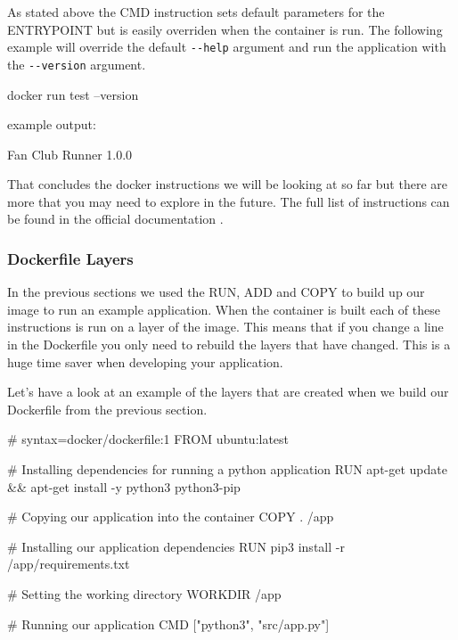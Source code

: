 \documentclass{csse4400}
\begin{document}
As stated above the CMD instruction sets default parameters for the ENTRYPOINT but is easily overriden when the container is run. The following example will override the default \verb|--help| argument and run the application with the \verb|--version| argument.

\begin{code}[language=shell,numbers=none]{}
  docker run test --version
\end{code}

example output:

\begin{code}[language=shell,numbers=none]{}
  Fan Club Runner 1.0.0
\end{code}

That concludes the docker instructions we will be looking at so far but there are more that you may need to explore in the future. The full list of instructions can be found in the official documentation \cite{Dockerfile}.

\subsubsection{Dockerfile Layers}

In the previous sections we used the RUN, ADD and COPY to build up our image to run an example application. When the container is built each of these instructions is run on a layer of the image. This means that if you change a line in the Dockerfile you only need to rebuild the layers that have changed. This is a huge time saver when developing your application.

Let's have a look at an example of the layers that are created when we build our Dockerfile from the previous section.

\begin{code}[language=docker,numbers=none]{}
  # syntax=docker/dockerfile:1
  FROM ubuntu:latest

  # Installing dependencies for running a python application
  RUN apt-get update && apt-get install -y python3 python3-pip

  # Copying our application into the container
  COPY . /app

  # Installing our application dependencies
  RUN pip3 install -r /app/requirements.txt

  # Setting the working directory
  WORKDIR /app

  # Running our application
  CMD ["python3", "src/app.py"]
\end{code}
\end{document}
